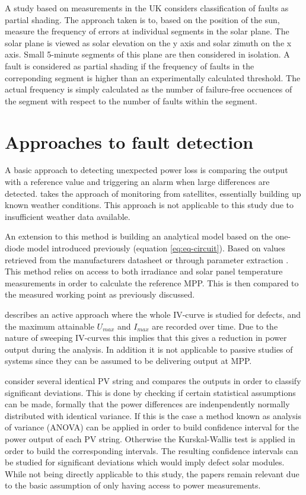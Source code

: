 A study based on measurements in the UK \cite{Firth2010} considers classification of faults as partial shading.
The approach taken is to, based on the position of the sun, measure the frequency of errors at individual segments in the solar plane.
The solar plane is viewed as solar elevation on the y axis and solar zimuth  on the x axis.
Small 5-minute segments of this plane are then considered in isolation.
A fault is considered as partial shading if the frequency of faults in the correponding segment is higher than an experimentally calculated threshold.
The actual frequency is simply calculated as the number of failure-free occuences of the segment with respect to the number of faults within the segment.

\section{Approaches to fault detection}
A basic approach to detecting unexpected power loss is comparing the output with a reference value and triggering an alarm when large differences are detected.
\cite{Stettler2005} takes the approach of monitoring from satellites, essentially building up known weather conditions.
This approach is not applicable to this study due to insufficient weather data available.

An extension to this method is building an analytical model \cite{Chouder2010,Raina2013,Chao2008}
based on the one-diode model introduced previously (equation \ref{eq:eq-circuit}).
Based on values retrieved from the manufacturers datasheet or through parameter extraction \cite{Eicker2005,Chouder2009,Walker2001}.
This method relies on access to both irradiance and solar panel temperature measurements in order to calculate the reference MPP.
This is then compared to the measured working point as previously discussed.

\cite{Meyer2004} describes an active approach where the whole IV-curve is studied for defects, and the maximum attainable $U_{max}$ and $I_{max}$ are recorded over time.
Due to the nature of sweeping IV-curves this implies that this gives a reduction in power output during the analysis.
In addition it is not applicable to passive studies of systems since they can be assumed to be delivering output at MPP.

\cite{Vergura2008,Vergura2009} consider several identical PV string and compares the outputs in order to classify significant deviations.
This is done by checking if certain statistical assumptions can be made, formally that the power differences are indenpendently normally distributed with identical variance.
If this is the case a method known as analysis of variance (ANOVA) can be applied in order to build confidence interval for the power output of each PV string.
Otherwise the Kurskal-Wallis test is applied in order to build the corresponding intervals.
The resulting confidence intervals can be studied for significant deviations which would imply defect solar modules.
While not being directly applicable to this study, the papers remain relevant due to the basic assumption of only having access to power measurements.

